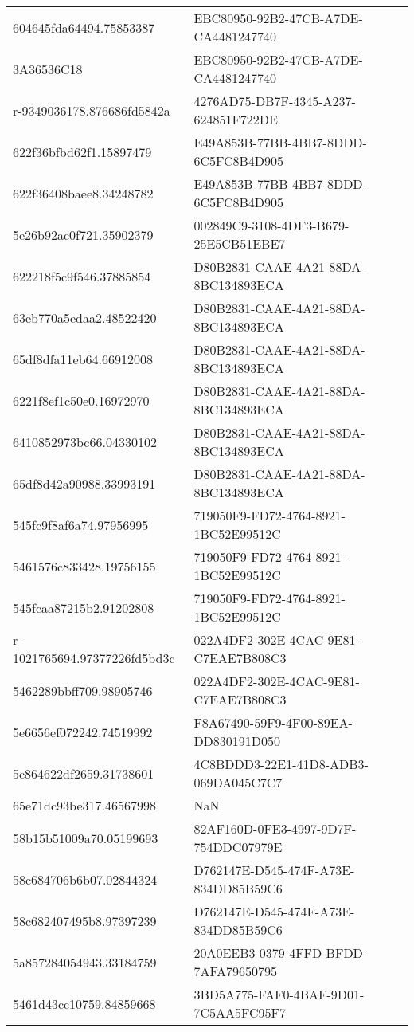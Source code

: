 \begin{tabular}{ll}
604645fda64494.75853387 & EBC80950-92B2-47CB-A7DE-CA4481247740 \\
3A36536C18 & EBC80950-92B2-47CB-A7DE-CA4481247740 \\
r-9349036178.876686fd5842a & 4276AD75-DB7F-4345-A237-624851F722DE \\
622f36bfbd62f1.15897479 & E49A853B-77BB-4BB7-8DDD-6C5FC8B4D905 \\
622f36408baee8.34248782 & E49A853B-77BB-4BB7-8DDD-6C5FC8B4D905 \\
5e26b92ac0f721.35902379 & 002849C9-3108-4DF3-B679-25E5CB51EBE7 \\
622218f5c9f546.37885854 & D80B2831-CAAE-4A21-88DA-8BC134893ECA \\
63eb770a5edaa2.48522420 & D80B2831-CAAE-4A21-88DA-8BC134893ECA \\
65df8dfa11eb64.66912008 & D80B2831-CAAE-4A21-88DA-8BC134893ECA \\
6221f8ef1c50e0.16972970 & D80B2831-CAAE-4A21-88DA-8BC134893ECA \\
6410852973bc66.04330102 & D80B2831-CAAE-4A21-88DA-8BC134893ECA \\
65df8d42a90988.33993191 & D80B2831-CAAE-4A21-88DA-8BC134893ECA \\
545fc9f8af6a74.97956995 & 719050F9-FD72-4764-8921-1BC52E99512C \\
5461576c833428.19756155 & 719050F9-FD72-4764-8921-1BC52E99512C \\
545fcaa87215b2.91202808 & 719050F9-FD72-4764-8921-1BC52E99512C \\
r-1021765694.97377226fd5bd3c & 022A4DF2-302E-4CAC-9E81-C7EAE7B808C3 \\
5462289bbff709.98905746 & 022A4DF2-302E-4CAC-9E81-C7EAE7B808C3 \\
5e6656ef072242.74519992 & F8A67490-59F9-4F00-89EA-DD830191D050 \\
5c864622df2659.31738601 & 4C8BDDD3-22E1-41D8-ADB3-069DA045C7C7 \\
65e71dc93be317.46567998 & NaN \\
58b15b51009a70.05199693 & 82AF160D-0FE3-4997-9D7F-754DDC07979E \\
58c684706b6b07.02844324 & D762147E-D545-474F-A73E-834DD85B59C6 \\
58c682407495b8.97397239 & D762147E-D545-474F-A73E-834DD85B59C6 \\
5a857284054943.33184759 & 20A0EEB3-0379-4FFD-BFDD-7AFA79650795 \\
5461d43cc10759.84859668 & 3BD5A775-FAF0-4BAF-9D01-7C5AA5FC95F7 \\

\end{tabular}
